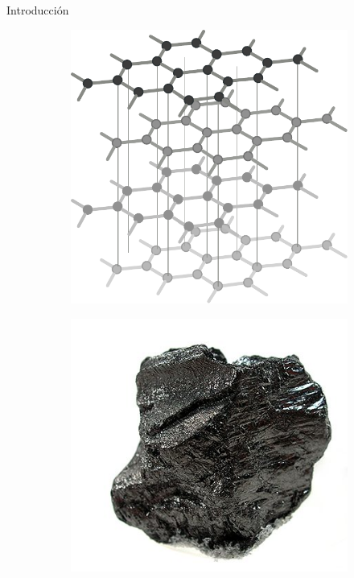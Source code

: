 \documentclass{beamer}
\begin{document}
	\begin{frame}{Introducción}
		\begin{figure}
			\centering
			\begin{subfigure}[b]{0.2\textwidth}
				\includegraphics[width=\textwidth]{graphite_structure.pdf}
				\caption{}
				\label{fig:graphite_struct}
			\end{subfigure}
			\begin{subfigure}[b]{0.2\textwidth}
				\includegraphics[width=\textwidth]{graphite_image.jpg}

\end{subfigure}
\end{figure}
\end{frame}
\end{document}
